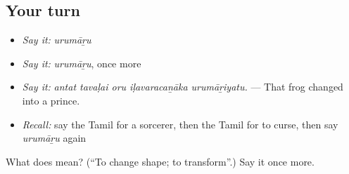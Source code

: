 \subsection*{Your turn}
\begin{itemize}
\raggedright
  \item \emph{Say it:} \emph{urumāṟu}
  \item \emph{Say it:} \emph{urumāṟu}, once more
  \item \emph{Say it:} \emph{antat tavaḷai oru iḷavaracaṉāka urumāṟiyatu.} — That frog changed into a prince.
  \item \emph{Recall:} say the Tamil for a sorcerer, then the Tamil for to curse, then say \emph{urumāṟu} again
\end{itemize}

\begin{tcolorbox}[breakable,colback=teal!4,colframe=teal!35!black,title={Before you move on}]
What does  mean? (\textquotedblleft{}To change shape; to transform\textquotedblright{}.) Say it once more.
\end{tcolorbox}
